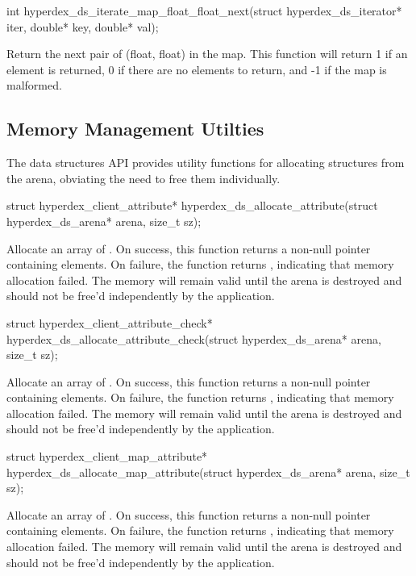 \begin{ccode}
int hyperdex_ds_iterate_map_float_float_next(struct hyperdex_ds_iterator* iter,
                                             double* key, double* val);
\end{ccode}
Return the next pair of (float, float) in the map.  This function will
return 1 if an element is returned, 0 if there are no elements to return, and -1
if the map is malformed.

\subsection{Memory Management Utilties}
\label{sec:api:c:client:memory}

The data structures API provides utility functions for allocating structures
from the arena, obviating the need to free them individually.

\begin{ccode}
struct hyperdex_client_attribute*
hyperdex_ds_allocate_attribute(struct hyperdex_ds_arena* arena, size_t sz);
\end{ccode}
Allocate an array of .  On
success, this function returns a non-null pointer containing  elements.
On failure, the function returns , indicating that memory allocation
failed.  The memory will remain valid until the arena is destroyed and should
not be free'd independently by the application.

\begin{ccode}
struct hyperdex_client_attribute_check*
hyperdex_ds_allocate_attribute_check(struct hyperdex_ds_arena* arena, size_t sz);
\end{ccode}
Allocate an array of .
On success, this function returns a non-null pointer containing 
elements.  On failure, the function returns , indicating that memory
allocation failed.  The memory will remain valid until the arena is destroyed
and should not be free'd independently by the application.

\begin{ccode}
struct hyperdex_client_map_attribute*
hyperdex_ds_allocate_map_attribute(struct hyperdex_ds_arena* arena, size_t sz);
\end{ccode}
Allocate an array of .
On success, this function returns a non-null pointer containing 
elements.  On failure, the function returns , indicating that memory
allocation failed.  The memory will remain valid until the arena is destroyed
and should not be free'd independently by the application.

